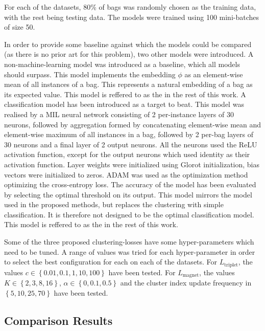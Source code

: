 For each of the datasets, 80\% of bags was randomly chosen as the training data, with the rest being testing data. The models were trained using 100 mini-batches of size 50.

In order to provide some baseline against which the models could be compared (as there is no prior art for this problem), two other models were introduced. A non-machine-learning model was introduced as a baseline, which all models should surpass. This model implements the embedding \( \phi \) as an element-wise mean of all instances of a bag. This represents a natural embedding of a bag as its expected value. This model is reffered to as the  in the rest of this work. A classification model has been introduced as a target to beat. This model was realised by a MIL neural network consisting of 2 per-instance layers of 30 neurons, followed by aggregation formed by concatenating element-wise mean and element-wise maximum of all instances in a bag, followed by 2 per-bag layers of 30 neurons and a final layer of 2 output neurons. All the neurons used the ReLU activation function, except for the output neurons which used identity as their activation function. Layer weights were initialized using Glorot initialization, bias vectors were initialized to zeros. ADAM was used as the optimization method optimizing the cross-entropy loss. The accuracy of the model has been evaluated by selecting the optimal threshold on its output. This model mirrors the model used in the proposed methods, but replaces the clustering with simple classification. It is therefore not designed to be the optimal classification model. This model is reffered to as the  in the rest of this work.

Some of the three proposed clustering-losses have some hyper-parameters which need to be tuned. A range of values was tried for each hyper-parameter in order to select the best configuration for each on each of the datasets. For \( L_\mathrm{triplet} \), the values \( c \in \left\{ 0.01, 0.1, 1, 10, 100 \right\} \) have been tested. For \( L_\mathrm{magnet} \), the values \( K \in \left\{ 2, 3, 8, 16 \right\} \), \( \alpha \in \left\{ 0, 0.1, 0.5 \right\} \) and the cluster index update frequency in \( \left\{ 5, 10, 25, 70 \right\} \) have been tested.

\subsection{Comparison Results}\label{sec:experiment-comparison}


